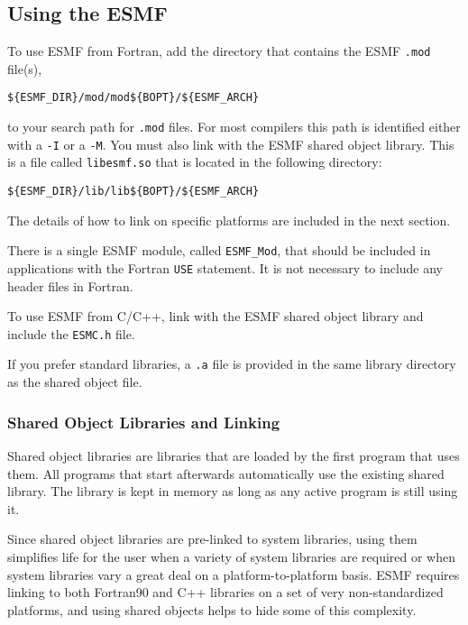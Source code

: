 
\subsection{Using the ESMF}
\label{UsingLibrary}

To use ESMF from Fortran, add the directory that contains
the ESMF {\tt *.mod} file(s),

\begin{verbatim}
${ESMF_DIR}/mod/mod${BOPT}/${ESMF_ARCH}
\end{verbatim} 

to your search path for {\tt *.mod} files.  For most compilers this path 
is identified either with a {\tt -I} or a {\tt -M}.  You must also link 
with the ESMF shared object library.  This is a file called 
{\tt libesmf.so} that is located in the following directory:

\begin{verbatim}
${ESMF_DIR}/lib/lib${BOPT}/${ESMF_ARCH}
\end{verbatim} 

The details of how to link on specific platforms are included in the 
next section.

There is a single ESMF module, called {\tt ESMF\_Mod}, that should be 
included in applications with the Fortran {\tt USE} statement.  It 
is not necessary to include any header files in Fortran.

To use ESMF from C/C++, link with the ESMF shared object library 
and include the {\tt ESMC.h} file. 

If you prefer standard libraries, a {\tt *.a} file is provided  
in the same library directory as the shared object file.  

\subsubsection{Shared Object Libraries and Linking}

Shared object libraries are libraries that are loaded by the first program 
that uses them. All programs that start afterwards automatically use the 
existing shared library. The library is kept in memory as long as any 
active program is still using it. 

Since shared object libraries are pre-linked to system libraries, using them
simplifies life for the user when a variety of system libraries are
required or when system libraries vary a great deal on a 
platform-to-platform basis.  ESMF requires linking to both Fortran90 and
C++ libraries on a set of very non-standardized platforms, and using
shared objects helps to hide some of this complexity.

